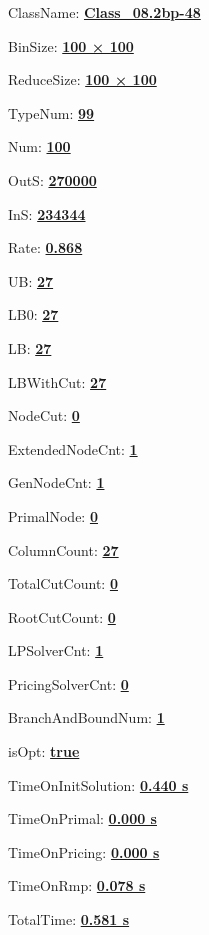 \documentclass[11pt]{article}
\begin{document}
\pagestyle{empty}


ClassName: \underline{\textbf{Class_08.2bp-48}}
\par
BinSize: \underline{\textbf{100 × 100}}
\par
ReduceSize: \underline{\textbf{100 × 100}}
\par
TypeNum: \underline{\textbf{99}}
\par
Num: \underline{\textbf{100}}
\par
OutS: \underline{\textbf{270000}}
\par
InS: \underline{\textbf{234344}}
\par
Rate: \underline{\textbf{0.868}}
\par
UB: \underline{\textbf{27}}
\par
LB0: \underline{\textbf{27}}
\par
LB: \underline{\textbf{27}}
\par
LBWithCut: \underline{\textbf{27}}
\par
NodeCut: \underline{\textbf{0}}
\par
ExtendedNodeCnt: \underline{\textbf{1}}
\par
GenNodeCnt: \underline{\textbf{1}}
\par
PrimalNode: \underline{\textbf{0}}
\par
ColumnCount: \underline{\textbf{27}}
\par
TotalCutCount: \underline{\textbf{0}}
\par
RootCutCount: \underline{\textbf{0}}
\par
LPSolverCnt: \underline{\textbf{1}}
\par
PricingSolverCnt: \underline{\textbf{0}}
\par
BranchAndBoundNum: \underline{\textbf{1}}
\par
isOpt: \underline{\textbf{true}}
\par
TimeOnInitSolution: \underline{\textbf{0.440 s}}
\par
TimeOnPrimal: \underline{\textbf{0.000 s}}
\par
TimeOnPricing: \underline{\textbf{0.000 s}}
\par
TimeOnRmp: \underline{\textbf{0.078 s}}
\par
TotalTime: \underline{\textbf{0.581 s}}
\par
\newpage


\end{document}
